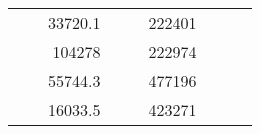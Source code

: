 \begin{table}[]
\begin{tabular}{|ccrccrccc}
\multicolumn{1}{|c|}{\cellcolor[HTML]{FFFFC7}}                                & \multicolumn{1}{c|}{\cellcolor[HTML]{DAE8FC}}                      & \multicolumn{1}{r|}{\cellcolor[HTML]{DAE8FC}33720.1}   & \multicolumn{1}{c|}{\cellcolor[HTML]{FFFFC7}}                                & \multicolumn{1}{c|}{\cellcolor[HTML]{DAE8FC}}                       & \multicolumn{1}{r|}{\cellcolor[HTML]{DDFDFF}222401}    &                                                                              &                                                                    &                                                        \\ \cline{3-3} \cline{6-6}
\multicolumn{1}{|c|}{\cellcolor[HTML]{FFFFC7}}                                & \multicolumn{1}{c|}{\cellcolor[HTML]{DAE8FC}}                      & \multicolumn{1}{r|}{\cellcolor[HTML]{DDFDFF}104278}    & \multicolumn{1}{c|}{\cellcolor[HTML]{FFFFC7}}                                & \multicolumn{1}{c|}{\cellcolor[HTML]{DAE8FC}}                       & \multicolumn{1}{r|}{\cellcolor[HTML]{DAE8FC}222974}    &                                                                              &                                                                    &                                                        \\ \cline{3-3} \cline{6-6}
\multicolumn{1}{|c|}{\cellcolor[HTML]{FFFFC7}}                                & \multicolumn{1}{c|}{\cellcolor[HTML]{DAE8FC}}                      & \multicolumn{1}{r|}{\cellcolor[HTML]{DAE8FC}55744.3}   & \multicolumn{1}{c|}{\cellcolor[HTML]{FFFFC7}}                                & \multicolumn{1}{c|}{\cellcolor[HTML]{DAE8FC}}                       & \multicolumn{1}{r|}{\cellcolor[HTML]{DDFDFF}477196}    &                                                                              &                                                                    &                                                        \\ \cline{3-3} \cline{6-6}
\multicolumn{1}{|c|}{\cellcolor[HTML]{FFFFC7}}                                & \multicolumn{1}{c|}{\cellcolor[HTML]{DAE8FC}}                      & \multicolumn{1}{r|}{\cellcolor[HTML]{DDFDFF}16033.5}   & \multicolumn{1}{c|}{\cellcolor[HTML]{FFFFC7}}                                & \multicolumn{1}{c|}{\cellcolor[HTML]{DAE8FC}}                       & \multicolumn{1}{r|}{\cellcolor[HTML]{DAE8FC}423271}    &                                                                              &                                                                    &                                                        \\ \cline{3-3} \cline{6-6}

\end{tabular}
\end{table}
